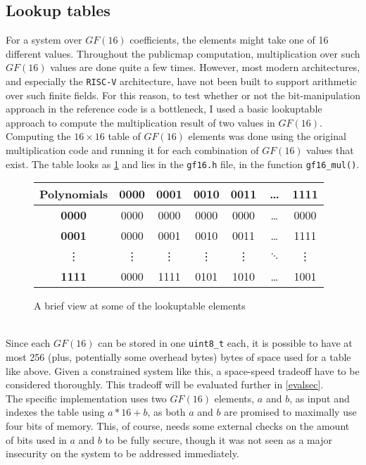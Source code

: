 \subsection{Lookup tables} \label{opt:lookup}
For a system over $GF(16)$ coefficients, the elements might take one of 16 different values. Throughout the publicmap computation, multiplication over such $GF(16)$ values are done quite a few times. However, most modern architectures, and especially the \texttt{RISC-V} architecture, have not been built to support arithmetic over such finite fields. For this reason, to test whether or not the bit-manipulation approach in the reference code is a bottleneck, I used a basic lookuptable approach to compute the multiplication result of two values in $GF(16)$.\medskip\\
Computing the $16 \times 16$ table of $GF(16)$ elements was done using the original multiplication code and running it for each combination of $GF(16)$ values that exist. 
The table looks as \cref{lookuptable} and lies in the \texttt{gf16.h} file, in the function \texttt{gf16\_mul()}.
\begin{figure}[t]
    \centering
    \begin{tabular}{|c|c|c|c|c|c|c|}
        \hline
            \textbf{Polynomials} & \textbf{0000} & \textbf{0001} & \textbf{0010} & \textbf{0011} & \dots & \textbf{1111} \\
        \hline
            \textbf{0000} & 0000 & 0000 & 0000 & 0000 & \dots & 0000\\
        \hline
            \textbf{0001} & 0000 & 0001 & 0010 & 0011 & \dots & 1111\\
        \hline
            \vdots & \vdots & \vdots & \vdots & \vdots & $\ddots$ & \vdots\\
        \hline
            \textbf{1111} & 0000 & 1111 & 0101 & 1010 & \dots & 1001\\
        \hline
    \end{tabular}
    \caption{A brief view at some of the lookuptable elements}
    \label{lookuptable}
\end{figure}\\
Since each $GF(16)$ can be stored in one \texttt{uint8\_t} each, it is possible to have at most 256 (plus, potentially some overhead bytes) bytes of space used for a table like above. Given a constrained system like this, a space-speed tradeoff have to be considered thoroughly. This tradeoff will be evaluated further in \cref{evalsec}.\medskip\\
The specific implementation uses two $GF(16)$ elements, $a$ and $b$, as input and indexes the table using $a*16 + b$, as both $a$ and $b$ are promised to maximally use four bits of memory. This, of course, needs some external checks on the amount of bits used in $a$ and $b$ to be fully secure, though it was not seen as a major insecurity on the system to be addressed immediately.
